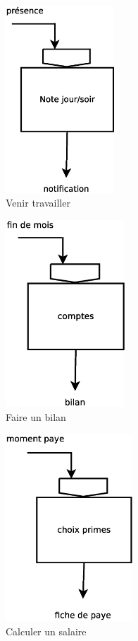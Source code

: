 \begin{figure}[!htb]
    \begin{center}
    \includegraphics[height=7cm]{images/cc1_mct2.eps}
    \caption{\label{cc1_mct2} Venir travailler}
    \end{center}
\end{figure}

\begin{figure}[!htb]
    \begin{center}
    \includegraphics[height=7cm]{images/cc1_mct3.eps}
    \caption{\label{cc1_mct3} Faire un bilan}
    \end{center}
\end{figure}

\begin{figure}[!htb]
    \begin{center}
    \includegraphics[height=7cm]{images/cc1_mct4.eps}
    \caption{\label{cc1_mct4} Calculer un salaire}
    \end{center}
\end{figure}

